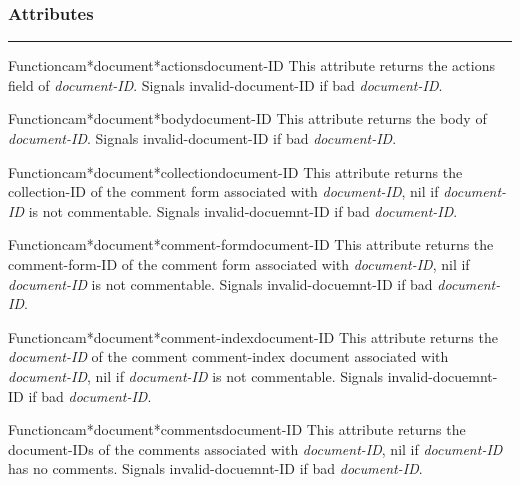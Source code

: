 \subsubsection*{Attributes}
\par\vspace*{0.00in}\par\hrule\par\medskip\par


\begin{functiondoc}{Function}{cam*document*actions}{document-ID}
This attribute returns the actions field of {\em document-ID}.
Signals invalid-document-ID if bad {\em document-ID}.
\end{functiondoc}

\begin{functiondoc}{Function}{cam*document*body}{document-ID}
This attribute returns the body of {\em document-ID}.
Signals invalid-document-ID if bad {\em document-ID}.
\end{functiondoc}

\begin{functiondoc}{Function}{cam*document*collection}{document-ID}
This attribute returns the collection-ID of the comment form associated
with {\em document-ID}, nil if {\em document-ID} is not commentable.
Signals invalid-docuemnt-ID if bad {\em document-ID}.
\end{functiondoc}

\begin{functiondoc}{Function}{cam*document*comment-form}{document-ID}
This attribute returns the comment-form-ID of the comment form associated
with {\em document-ID}, nil if {\em document-ID} is not commentable.
Signals invalid-docuemnt-ID if bad {\em document-ID}.
\end{functiondoc}

\begin{functiondoc}{Function}{cam*document*comment-index}{document-ID}
This attribute returns the {\em document-ID} of the comment comment-index document associated
with {\em document-ID}, nil if {\em document-ID} is not commentable.
Signals invalid-docuemnt-ID if bad {\em document-ID}.
\end{functiondoc}

\begin{functiondoc}{Function}{cam*document*comments}{document-ID}
This attribute returns the document-IDs of the comments associated
with {\em document-ID}, nil if {\em document-ID} has no comments.
Signals invalid-docuemnt-ID if bad {\em document-ID}.
\end{functiondoc}

